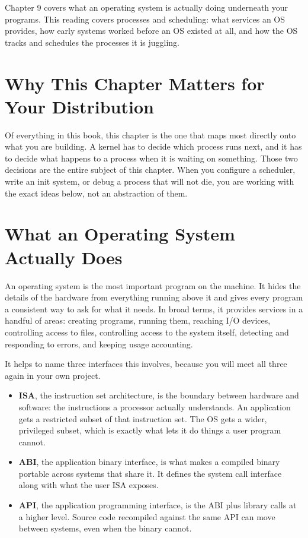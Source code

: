 \documentclass[11pt]{article}
\begin{document}

\noindent
Chapter 9 covers what an operating system is actually doing underneath your programs. This reading covers processes and scheduling: what services an OS provides, how early systems worked before an OS existed at all, and how the OS tracks and schedules the processes it is juggling.

\section{Why This Chapter Matters for Your Distribution}

Of everything in this book, this chapter is the one that maps most directly onto what you are building. A kernel has to decide which process runs next, and it has to decide what happens to a process when it is waiting on something. Those two decisions are the entire subject of this chapter. When you configure a scheduler, write an init system, or debug a process that will not die, you are working with the exact ideas below, not an abstraction of them.

\section{What an Operating System Actually Does}

An operating system is the most important program on the machine. It hides the details of the hardware from everything running above it and gives every program a consistent way to ask for what it needs. In broad terms, it provides services in a handful of areas: creating programs, running them, reaching I/O devices, controlling access to files, controlling access to the system itself, detecting and responding to errors, and keeping usage accounting.

It helps to name three interfaces this involves, because you will meet all three again in your own project.

\begin{itemize}[leftmargin=1.4em]
  \item \textbf{ISA}, the instruction set architecture, is the boundary between hardware and software: the instructions a processor actually understands. An application gets a restricted subset of that instruction set. The OS gets a wider, privileged subset, which is exactly what lets it do things a user program cannot.
  \item \textbf{ABI}, the application binary interface, is what makes a compiled binary portable across systems that share it. It defines the system call interface along with what the user ISA exposes.
  \item \textbf{API}, the application programming interface, is the ABI plus library calls at a higher level. Source code recompiled against the same API can move between systems, even when the binary cannot.
\end{itemize}
\end{document}
